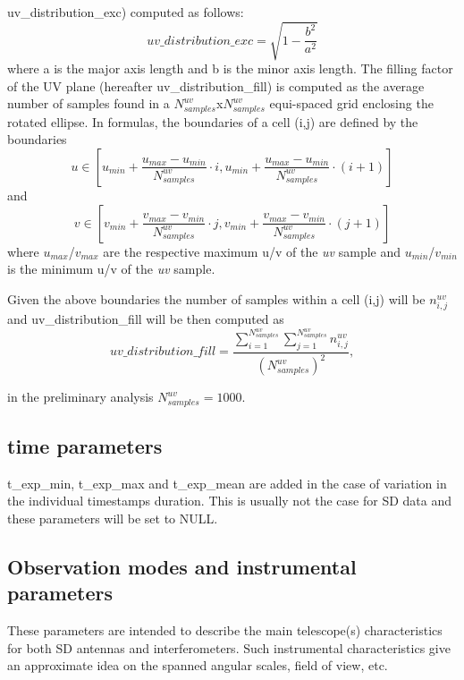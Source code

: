 \documentclass[11pt,a4paper]{ivoa}
\begin{document}
uv\_distribution\_exc) computed as follows:
\begin{equation}
uv\_distribution\_exc = \sqrt{1-\frac{b^2}{a^2}}
\end{equation}
where a is the major axis length and b is the minor axis length.
The filling factor of the UV plane (hereafter uv\_distribution\_fill) is computed as the average 
number of samples found in a $N^{uv}_{samples}$x$N^{uv}_{samples}$ equi-spaced grid enclosing the 
rotated ellipse. In formulas, the boundaries of a cell (i,j) are defined by the boundaries
\begin{equation}
u \in [u_{min} + \frac{u_{max} - u_{min}}{N^{uv}_{samples}} \cdot i , u_{min} + \frac{u_{max} - 
u_{min}}{N^{uv}_{samples}} \cdot (i + 1)]
\end{equation} 
and
\begin{equation}
v \in [v_{min} + \frac{v_{max} - v_{min}}{N^{uv}_{samples}} \cdot j , v_{min} + \frac{v_{max} - 
v_{min}}{N^{uv}_{samples}} \cdot (j + 1)]
\end{equation} 
where $u_{max}$/$v_{max}$ are the respective maximum u/v of the \emph{uv} sample and 
$u_{min}$/$v_{min}$ is the minimum u/v of the \emph{uv} sample.

Given the above boundaries the number of samples within a cell (i,j) will be $n^{uv}_{i,j}$ 
and uv\_distribution\_fill will be then computed as 
\begin{equation}
uv\_distribution\_fill = \frac{\sum^{N^{uv}_{samples}}_{i=1} \sum^{N^{uv}_{samples}}_{j=1} 
n^{uv}_{i,j} }{(N^{uv}_{samples}) ^ 2},
\end{equation}

in the preliminary analysis $N^{uv}_{samples} = 1000$.



\subsection{time parameters}
t\_exp\_min, t\_exp\_max and t\_exp\_mean are added in the case of variation in the individual timestamps 
duration. This is usually not the case for SD data and these parameters will be set to NULL.


\subsection{Observation modes and instrumental parameters}
These parameters are intended to describe the main telescope(s) characteristics for both SD antennas and interferometers. Such instrumental characteristics give an approximate idea on the spanned angular scales, field of view, etc. 
\end{document}
